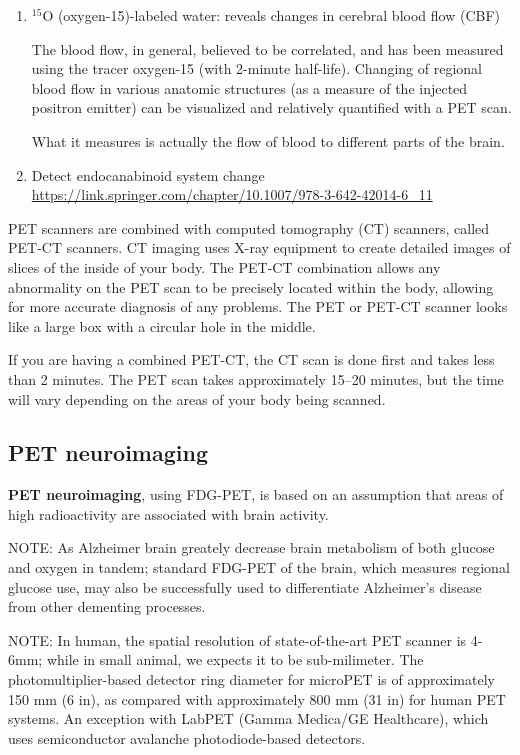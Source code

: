 \begin{enumerate}
   \item  $^{15}$O (oxygen-15)-labeled water: reveals changes in cerebral blood flow (CBF)
   
   The blood flow, in general, believed to be correlated, and has been measured
   using the tracer oxygen-15 (with 2-minute half-life). Changing of regional
   blood flow in various anatomic structures (as a measure of the injected
   positron emitter) can be visualized and relatively quantified with a PET scan.
   
   What it measures is actually the flow of blood to different parts of the
   brain. 
   
   \item Detect endocanabinoid system change
   \url{https://link.springer.com/chapter/10.1007/978-3-642-42014-6_11}
    
   
\end{enumerate}

\label{sec:PET-CT-scan}
PET scanners are combined with computed tomography (CT) scanners, called PET-CT
scanners. CT imaging uses X-ray equipment to create detailed images of slices of
the inside of your body. The PET-CT combination allows any abnormality on the
PET scan to be precisely located within the body, allowing for more accurate
diagnosis of any problems. The PET or PET-CT scanner looks like a large box with
a circular hole in the middle.

If you are having a combined PET-CT, the CT scan is done first and takes less than 2
minutes. The PET scan takes approximately 15–20 minutes, but the time will vary
depending on the areas of your body being scanned.


\subsection{PET neuroimaging}
\label{sec:PET-neuroimaging}

{\bf PET neuroimaging}, using FDG-PET, is based on an assumption that areas
   of high radioactivity are associated with brain activity.
   
   
   NOTE: As Alzheimer brain greately decrease brain metabolism of both glucose
   and oxygen in tandem; standard FDG-PET of the brain, which measures regional
   glucose use, may also be successfully used to differentiate Alzheimer's
   disease from other dementing processes.
   
NOTE: In human, the spatial resolution of state-of-the-art PET scanner is 4-6mm;
while in small animal, we expects it to be sub-milimeter. The
photomultiplier-based detector ring diameter for microPET is of approximately
150 mm (6 in), as compared with approximately 800 mm (31 in) for human PET
systems. An exception with LabPET (Gamma Medica/GE Healthcare), which uses
semiconductor avalanche photodiode-based detectors.




